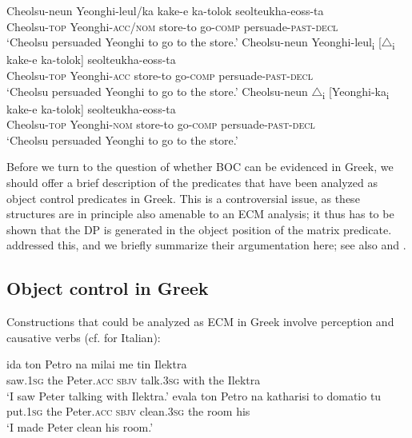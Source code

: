 \documentclass[output=paper]{langsci/langscibook}
\begin{document}
\ea%
    \label{ex:alexiadou:34}
    \ea\gll Cheolsu-neun  Yeonghi-leul/ka     kake-e    ka-tolok   seolteukha-eoss-ta\\
            Cheolsu-\textsc{top}     Yeonghi-\textsc{acc/nom}   store-to  go-\textsc{comp}   persuade-\textsc{past-decl}\\
    \glt    ‘Cheolsu persuaded Yeonghi to go to the store.’
    \ex
    \gll Cheolsu-neun Yeonghi-leul\textsubscript{i} [${\bigtriangleup}$\textsubscript{i} kake-e     ka-tolok]  seolteukha-eoss-ta\\
             Cheolsu-\textsc{top}    Yeonghi-\textsc{acc}    {}      store-to   go-\textsc{comp}   persuade-\textsc{past-decl}\\
    \glt     ‘Cheolsu persuaded Yeonghi to go to the store.’     
    \ex
    \gll Cheolsu-neun ${\bigtriangleup}$\textsubscript{i} [Yeonghi-ka\textsubscript{i}    kake-e    ka-tolok]  seolteukha-eoss-ta\\
             Cheolsu-\textsc{top}  {}       Yeonghi-\textsc{nom}    store-to  go-\textsc{comp}      persuade-\textsc{past-decl}\\
    \glt     ‘Cheolsu persuaded Yeonghi to go to the store.’ 
    \z
\z

Before we turn to the question of whether BOC can be evidenced in Greek, we should offer a brief description of the predicates that have been analyzed as object control predicates in Greek. This is a controversial issue, as these structures are in principle also amenable to an ECM analysis; it thus has to be shown that the DP is generated in the object position of the matrix predicate. \citet{Alexiadou1997} addressed this, and we briefly summarize their argumentation here; see also \citet{Kotzoglou2002} and \citet{Kotzoglou2007}. 

\subsection{Object control in Greek}%
Constructions that could be analyzed as ECM in Greek involve perception and causative verbs (cf. \citealt{Burzio1986} for Italian):


\ea%
    \label{ex:alexiadou:35}
    \ea \gll ida          ton  Petro         na    milai     me   tin Ilektra\\
             saw{}.\textsc{1sg}  the   Peter{}.\textsc{acc}  \textsc{sbjv} talk.\textsc{3sg} with  the Ilektra\\
    \glt     ‘I saw Peter talking with Ilektra.’
    \ex
    \gll evala      ton Petro       na     katharisi   to   domatio tu\\ 
             put{}.\textsc{1sg}  the Peter{}.\textsc{acc} \textsc{sbjv}   clean.\textsc{3sg}  the  room     his\\
    \glt     ‘I made Peter clean his room.’
    \z
\z    
\end{document}
